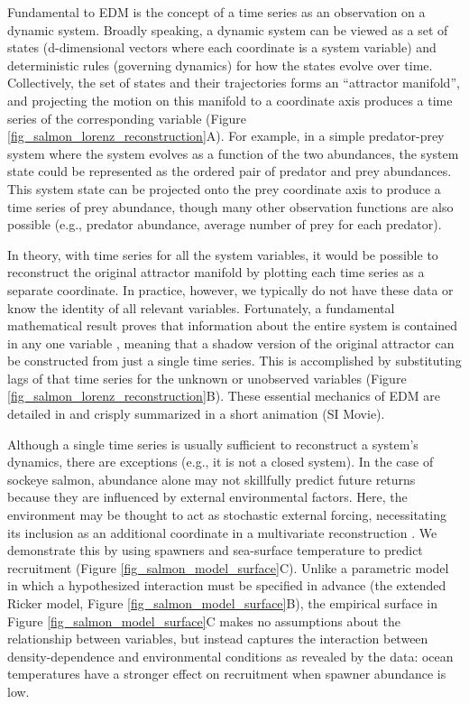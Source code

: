 Fundamental to EDM is the concept of a time series as an observation on a dynamic system. Broadly speaking, a dynamic system can be viewed as a set of states (d-dimensional vectors where each coordinate is a system variable) and deterministic rules (governing dynamics) for how the states evolve over time. Collectively, the set of states and their trajectories forms an ``attractor manifold'', and projecting the motion on this manifold to a coordinate axis produces a time series of the corresponding variable (Figure \ref{fig_salmon_lorenz_reconstruction}A). For example, in a simple predator-prey system where the system evolves as a function of the two abundances, the system state could be represented as the ordered pair of predator and prey abundances. This system state can be projected onto the prey coordinate axis to produce a time series of prey abundance, though many other observation functions are also possible (e.g., predator abundance, average number of prey for each predator).

In theory, with time series for all the system variables, it would be possible to reconstruct the original attractor manifold by plotting each time series as a separate coordinate. In practice, however, we typically do not have these data or know the identity of all relevant variables. Fortunately, a fundamental mathematical result proves that information about the entire system is contained in any one variable \cite{Takens_1981, Deyle_2011}, meaning that a shadow version of the original attractor can be constructed from just a single time series. This is accomplished by substituting lags of that time series for the unknown or unobserved variables (Figure \ref{fig_salmon_lorenz_reconstruction}B). These essential mechanics of EDM are detailed in \cite{Sugihara_2012} and crisply summarized in a short animation (SI Movie).

Although a single time series is usually sufficient to reconstruct a system's dynamics, there are exceptions (e.g., it is not a closed system). In the case of sockeye salmon, abundance alone may not skillfully predict future returns because they are influenced by external environmental factors. Here, the environment may be thought to act as stochastic external forcing, necessitating its inclusion as an additional coordinate in a multivariate reconstruction \cite{Dixon_1999, Deyle_2013, Deyle_2011}. We demonstrate this by using spawners and sea-surface temperature to predict recruitment (Figure \ref{fig_salmon_model_surface}C). Unlike a parametric model in which a hypothesized interaction must be specified in advance (the extended Ricker model, Figure \ref{fig_salmon_model_surface}B), the empirical surface in Figure \ref{fig_salmon_model_surface}C makes no assumptions about the relationship between variables, but instead captures the interaction between density-dependence and environmental conditions as revealed by the data: ocean temperatures have a stronger effect on recruitment when spawner abundance is low. 


